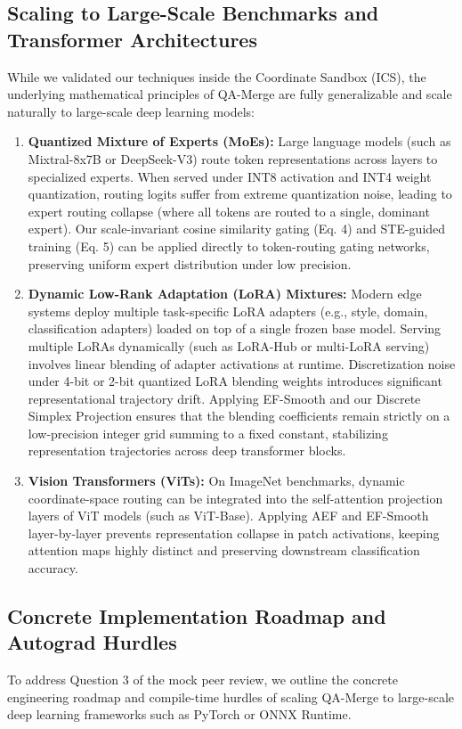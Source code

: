 \documentclass{article}
\theoremstyle{plain}
\theoremstyle{definition}
\theoremstyle{remark}
\begin{document}
\subsection{Scaling to Large-Scale Benchmarks and Transformer Architectures}
While we validated our techniques inside the Coordinate Sandbox (ICS), the underlying mathematical principles of QA-Merge are fully generalizable and scale naturally to large-scale deep learning models:
\begin{enumerate}
    \item \textbf{Quantized Mixture of Experts (MoEs):} Large language models (such as Mixtral-8x7B or DeepSeek-V3) route token representations across layers to specialized experts. When served under INT8 activation and INT4 weight quantization, routing logits suffer from extreme quantization noise, leading to expert routing collapse (where all tokens are routed to a single, dominant expert). Our scale-invariant cosine similarity gating (Eq. 4) and STE-guided training (Eq. 5) can be applied directly to token-routing gating networks, preserving uniform expert distribution under low precision.
    \item \textbf{Dynamic Low-Rank Adaptation (LoRA) Mixtures:} Modern edge systems deploy multiple task-specific LoRA adapters (e.g., style, domain, classification adapters) loaded on top of a single frozen base model. Serving multiple LoRAs dynamically (such as LoRA-Hub or multi-LoRA serving) involves linear blending of adapter activations at runtime. Discretization noise under 4-bit or 2-bit quantized LoRA blending weights introduces significant representational trajectory drift. Applying EF-Smooth and our Discrete Simplex Projection ensures that the blending coefficients remain strictly on a low-precision integer grid summing to a fixed constant, stabilizing representation trajectories across deep transformer blocks.
    \item \textbf{Vision Transformers (ViTs):} On ImageNet benchmarks, dynamic coordinate-space routing can be integrated into the self-attention projection layers of ViT models (such as ViT-Base). Applying AEF and EF-Smooth layer-by-layer prevents representation collapse in patch activations, keeping attention maps highly distinct and preserving downstream classification accuracy.
\end{enumerate}

\subsection{Concrete Implementation Roadmap and Autograd Hurdles}
To address Question 3 of the mock peer review, we outline the concrete engineering roadmap and compile-time hurdles of scaling QA-Merge to large-scale deep learning frameworks such as PyTorch or ONNX Runtime.
\end{document}
